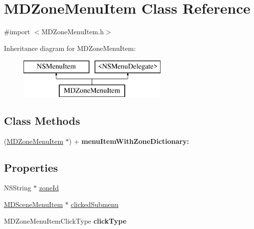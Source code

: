 \hypertarget{interface_m_d_zone_menu_item}{\section{M\-D\-Zone\-Menu\-Item Class Reference}
\label{interface_m_d_zone_menu_item}
}


{\ttfamily \#import $<$M\-D\-Zone\-Menu\-Item.\-h$>$}

Inheritance diagram for M\-D\-Zone\-Menu\-Item\-:\begin{figure}[H]
\begin{center}
\leavevmode
\includegraphics[height=2.000000cm]{interface_m_d_zone_menu_item}
\end{center}
\end{figure}
\subsection*{Class Methods}
\begin{DoxyCompactItemize}
\item 
\hypertarget{interface_m_d_zone_menu_item_aee59d24738e6900cf6d5cd545af9eda2}{(\hyperlink{interface_m_d_zone_menu_item}{M\-D\-Zone\-Menu\-Item} $\ast$) + {\bfseries menu\-Item\-With\-Zone\-Dictionary\-:}}\label{interface_m_d_zone_menu_item_aee59d24738e6900cf6d5cd545af9eda2}

\end{DoxyCompactItemize}
\subsection*{Properties}
\begin{DoxyCompactItemize}
\item 
N\-S\-String $\ast$ \hyperlink{interface_m_d_zone_menu_item_a0233a890891b84a2c30226439a3185ea}{zone\-Id}
\item 
\hyperlink{interface_m_d_scene_menu_item}{M\-D\-Scene\-Menu\-Item} $\ast$ \hyperlink{interface_m_d_zone_menu_item_a6a4957a6b3fe720a65aa67f6c07be18f}{clicked\-Submenu}
\item 
\hypertarget{interface_m_d_zone_menu_item_a17353c5d03094c9e62a49e1127854eb9}{M\-D\-Zone\-Menu\-Item\-Click\-Type {\bfseries click\-Type}}\label{interface_m_d_zone_menu_item_a17353c5d03094c9e62a49e1127854eb9}

\end{DoxyCompactItemize}


